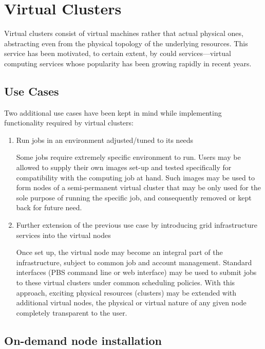 \documentclass{article}
\begin{document}
\section{Virtual Clusters}
Virtual clusters consist of virtual machines rather that actual physical ones, abstracting even from the physical topology of the underlying resources. This service has been motivated, to certain extent, by could services---virtual computing services whose popularity has been growing rapidly in recent years.

\subsection{Use Cases}

Two additional use cases have been kept in mind while implementing functionality required by virtual clusters:

\medskip

\begin{enumerate}

\item Run jobs in an environment adjusted/tuned to its needs

\medskip

Some jobs require extremely specific environment to run. Users may be allowed to supply their own images set-up and tested specifically for compatibility with the computing job at hand. Such images may be used to form nodes of a semi-permanent virtual cluster that may be only used for the sole purpose of running the specific job, and consequently removed or kept back for future need.

\medskip

\item Further extension of the previous use case by introducing grid infrastructure services into the virtual nodes

\medskip

Once set up, the virtual node may become an integral part of the infrastructure, subject to common job and account management. Standard interfaces (PBS command line or web interface) may be used to submit jobs to these virtual clusters under common scheduling policies. With this approach, exciting physical resources (clusters) may be extended with additional virtual nodes, the physical or virtual nature of any given node completely transparent to the user.

\end{enumerate}

\subsection{On-demand node installation}
\end{document}
